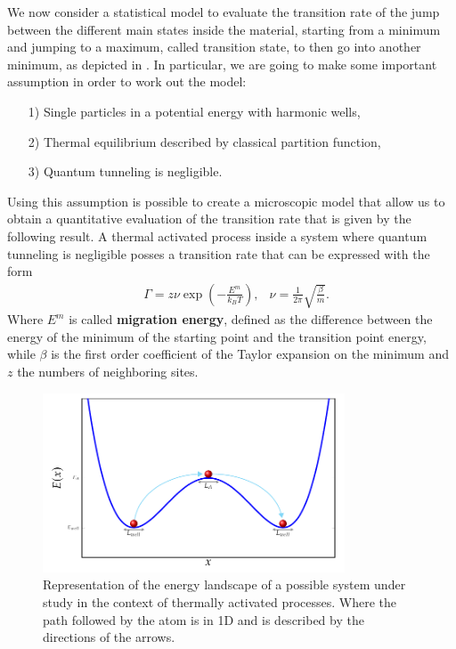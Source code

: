 We now consider a statistical model to evaluate the transition rate of the jump between the different main states inside the material, starting from a minimum and jumping to a maximum, called transition state, to then go into another minimum, as depicted in . In particular, we are going to make some important assumption in order to work out the model:
\begin{enumerate}
    \item[1)] Single particles in a potential energy with harmonic wells, 
    \item[2)] Thermal equilibrium described by classical partition function, 
    \item[3)] Quantum tunneling is negligible.
\end{enumerate}
Using this assumption is possible to create a microscopic model that allow us to obtain a quantitative evaluation of the transition rate that is given by the following result.
{
    A thermal activated process inside a system where quantum tunneling is negligible posses a transition rate that can be expressed with the form
    \begin{align}
        &\Gamma = z\nu\exp\left( -\frac{E^m}{k_BT} \right), &\nu = \frac{1}{2\pi}\sqrt{\frac{\beta}{m}}.
    \end{align}
    Where $E^m$ is called \textbf{migration energy}, defined as the difference between the energy of the minimum of the starting point and the transition point energy, while $\beta$ is the first order coefficient of the Taylor expansion on the minimum and $z$ the numbers of neighboring sites.
}
\begin{figure}[t]
    \centering
    \includegraphics[width=0.8\textwidth]{Immagini/ThermAct.pdf}
    \caption
    {
        Representation of the energy landscape of a possible system under study in the context of thermally activated processes. Where the path followed by the atom is in 1D and is described by the directions of the arrows.
    }
    \label{fig:ThermAct}
\end{figure}
